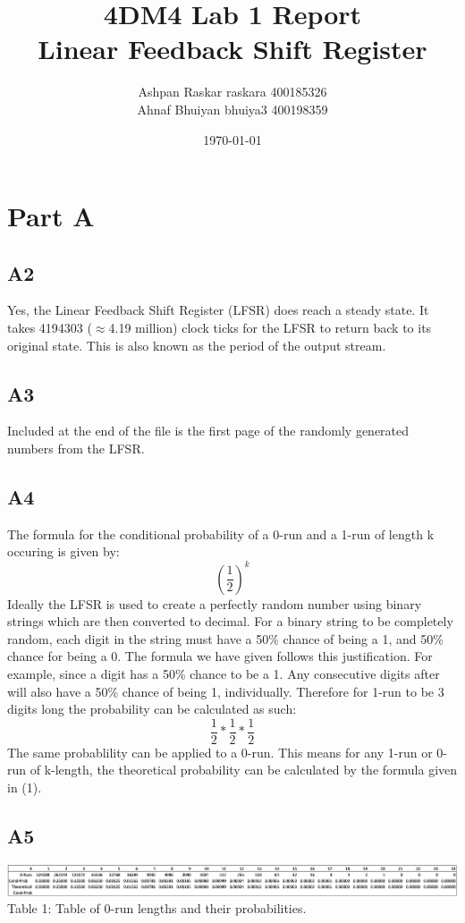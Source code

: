\documentclass[12pt, letterpaper, titlepage, hidelinks]{article}
\title{4DM4 Lab 1 Report \\ Linear Feedback Shift Register}
\author{Ashpan Raskar raskara 400185326\\
		Ahnaf Bhuiyan bhuiya3 400198359}
\date{\today}
\begin{document}
\maketitle
\tableofcontents
\newpage
\setlength{\parindent}{0pt}
\setcounter{secnumdepth}{0}
\section{Part A}
	\subsection{A2}
		Yes, the Linear Feedback Shift Register (LFSR) does reach a steady state. It takes 4194303 ($\approx$4.19 million) clock ticks for the LFSR to return back to its original state. This is also known as the period of the output stream.
	\subsection{A3}
		Included at the end of the file is the first page of the randomly generated numbers from the LFSR\@.
	\subsection{A4}
		The formula for the conditional probability of a 0-run and a 1-run of length k occuring is given by:
		\begin{equation}
			{(\frac{1}{2})}^{k}
		\end{equation}
		Ideally the LFSR is used to create a perfectly random number using binary strings which are then converted to decimal. For a binary string to be completely random, each digit in the string must have a 50\% chance of being a 1, and 50\% chance for being a 0. The formula we have given follows this justification. For example, since a digit has a 50\% chance to be a 1. Any consecutive digits after will also have a 50\% chance of being 1, individually. Therefore for 1-run to be 3 digits long the probability can be calculated as such:
		\begin{equation}
			\frac{1}{2} * \frac{1}{2} * \frac{1}{2}
		\end{equation}
		The same probablility can be applied to a 0-run. This means for any 1-run or 0-run of k-length, the theoretical probability can be calculated by the formula given in (1).
	\subsection{A5}
		\includegraphics[width=\textwidth]{0_run_table}
		Table 1: Table of 0-run lengths and their probabilities.
\end{document}
